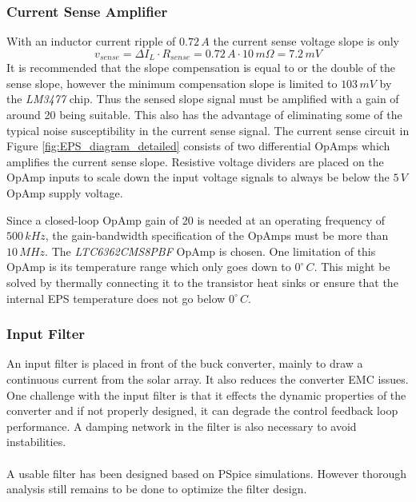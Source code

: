 \subsubsection*{Current Sense Amplifier}
With an inductor current ripple of $0.72\,A$ the current sense voltage slope is only 
%
\begin{equation}
v_{sense}=\Delta I_L\cdot R_{sense}=0.72\,A\cdot 10\,m\Omega = 7.2\,mV
\end{equation}
%
It is recommended that the slope compensation is equal to or the double of the sense slope\cite[sec. 12-1]{Fundamentals}, however the minimum compensation slope is limited to $103\,mV$ by the \textit{LM3477} chip. Thus the sensed slope signal must be amplified with a gain of around 20 being suitable. This also has the advantage of eliminating some of the typical noise susceptibility in the current sense signal. The current sense circuit in Figure \ref{fig:EPS_diagram_detailed} consists of two differential OpAmps which amplifies the current sense slope. Resistive voltage dividers are placed on the OpAmp inputs to scale down the input voltage signals to always be below the $5\,V$ OpAmp supply voltage.

Since a closed-loop OpAmp gain of 20 is needed at an operating frequency of $500\,kHz$, the gain-bandwidth specification of the OpAmps must be more than $10\,MHz$. The \textit{LTC6362CMS8PBF} OpAmp is chosen. One limitation of this OpAmp is its temperature range which only goes down to $0^{\circ}\,C$. This might be solved by thermally connecting it to the transistor heat sinks or ensure that the internal \ac{EPS} temperature does not go below $0^{\circ}\,C$.
%
\subsubsection*{Input Filter}
An input filter is placed in front of the buck converter, mainly to draw a continuous current from the solar array. It also reduces the converter \ac{EMC} issues. 
One challenge with the input filter is that it effects the dynamic properties of the converter and if not properly designed, it can degrade the control feedback loop performance. A damping network in the filter is also necessary to avoid instabilities\cite[sec. 10-3]{Fundamentals}.
\\
\\
A usable filter has been designed based on PSpice simulations. However thorough analysis still remains to be done to optimize the filter design.
%
%
